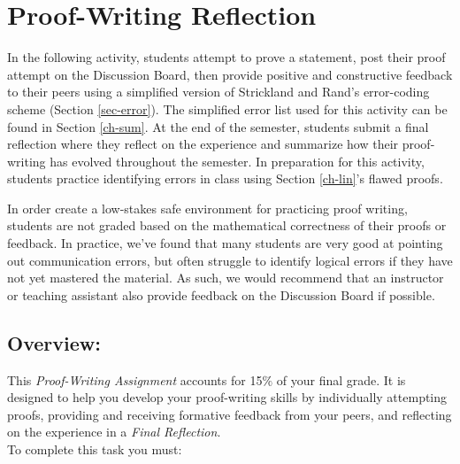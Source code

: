 \section{Proof-Writing Reflection}

In the following activity, students attempt to prove a statement, post their proof attempt on the Discussion Board, then provide positive and constructive feedback to their peers using a simplified version of Strickland and Rand's error-coding scheme (Section \ref{sec-error}). The simplified error list used for this activity can be found in Section \ref{ch-sum}. At the end of the semester, students submit a final reflection where they reflect on the experience and summarize how their proof-writing has evolved throughout the semester. In preparation for this activity, students practice identifying errors in class using Section \ref{ch-lin}'s flawed proofs.

In order create a low-stakes safe environment for practicing proof writing, students are not graded based on the mathematical correctness of their proofs or feedback. In practice, we've found that many students are very good at pointing out communication errors, but often struggle to identify logical errors if they have not yet mastered the material. As such, we would recommend that an instructor or teaching assistant also provide feedback on the Discussion Board if possible.

\subsection*{Overview:}

This \emph{Proof-Writing Assignment} accounts for 15$\%$ of your final grade. It is designed to help you develop your proof-writing skills by individually attempting proofs, providing and receiving formative feedback from your peers, and reflecting on the experience in a \emph{Final Reflection}. \\

To complete this task you must:

